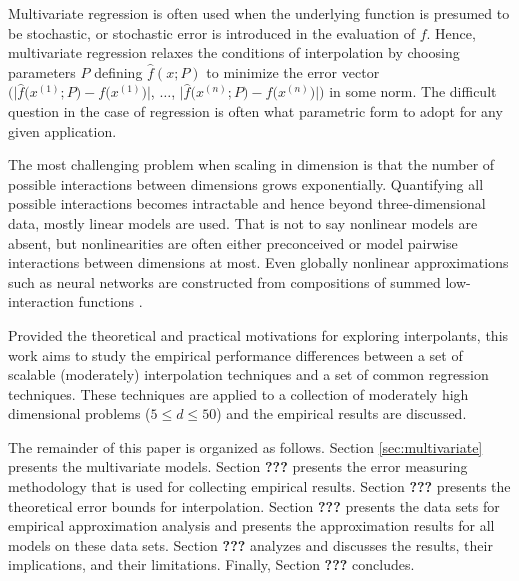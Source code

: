 \documentclass[sigconf]{acmart}
\def\Bigl{\mathopen\Big}
\def\Bigr{\mathclose\Big}
\begin{document}
Multivariate regression is often used when the underlying function is presumed to be stochastic, or stochastic error is introduced in the evaluation of $f$. Hence, multivariate regression relaxes the conditions of interpolation by choosing parameters $P$ defining $\hat f(x;P)$ to minimize the error vector $\Bigl( \bigl | \hat f \bigl(x^{(1)};P\bigr) - f\bigl(x^{(1)}\bigr) \bigr|$, $\ldots$, $\bigl | \hat f \bigl(x^{(n)}; P\bigr) - f\bigl(x^{(n)}\bigr) \bigr | \Bigr)$ in some norm. The difficult question in the case of regression is often what parametric form to adopt for any given application.

The most challenging problem when scaling in dimension is that the number of possible interactions between dimensions grows exponentially. Quantifying all possible interactions becomes intractable and hence beyond three-dimensional data, mostly linear models are used. That is not to say nonlinear models are absent, but nonlinearities are often either preconceived or model pairwise interactions between dimensions at most. Even globally nonlinear approximations such as neural networks are constructed from compositions of summed low-interaction functions \cite{clevert2015fast}.

Provided the theoretical and practical motivations for exploring interpolants, this work aims to study the empirical performance differences between a set of scalable (moderately) interpolation techniques and a set of common regression techniques. These techniques are applied to a collection of moderately high dimensional problems ($5 \le d \le 50$) and the empirical results are discussed.

The remainder of this paper is organized as follows. Section \ref{sec:multivariate} presents the multivariate models. Section \textbf{???} presents the error measuring methodology that is used for collecting empirical results. Section \textbf{???} presents the theoretical error bounds for interpolation. Section \textbf{???} presents the data sets for empirical approximation analysis and presents the approximation results for all models on these data sets. Section \textbf{???} analyzes and discusses the results, their implications, and their limitations. Finally, Section \textbf{???} concludes.

\end{document}
